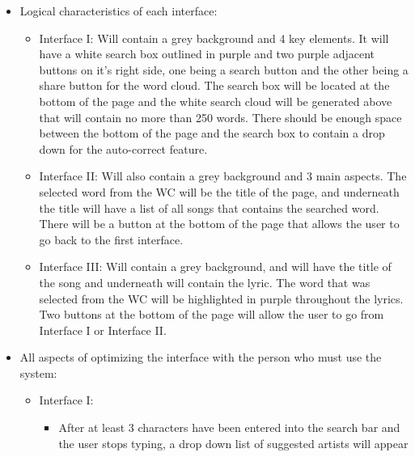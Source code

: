 \documentclass[]{article}
\begin{document}
\begin{itemize}
\itemsep1pt\parskip0pt
\item
  Logical characteristics of each interface:

  \begin{itemize}
  \itemsep1pt\parskip0pt
  \item
    Interface I: Will contain a grey background and 4 key elements. It
    will have a white search box outlined in purple and two purple
    adjacent buttons on it's right side, one being a search button and
    the other being a share button for the word cloud. The search box
    will be located at the bottom of the page and the white search cloud
    will be generated above that will contain no more than 250 words.
    There should be enough space between the bottom of the page and the
    search box to contain a drop down for the auto-correct feature.
  \item
    Interface II: Will also contain a grey background and 3 main
    aspects. The selected word from the WC will be the title of the
    page, and underneath the title will have a list of all songs that
    contains the searched word. There will be a button at the bottom of
    the page that allows the user to go back to the first interface.
  \item
    Interface III: Will contain a grey background, and will have the
    title of the song and underneath will contain the lyric. The word
    that was selected from the WC will be highlighted in purple
    throughout the lyrics. Two buttons at the bottom of the page will
    allow the user to go from Interface I or Interface II.
  \end{itemize}
\item
  All aspects of optimizing the interface with the person who must use
  the system:

  \begin{itemize}
  \itemsep1pt\parskip0pt
  \item
    Interface I:

    \begin{itemize}
    \itemsep1pt\parskip0pt
    \item
      After at least 3 characters have been entered into the search bar
      and the user stops typing, a drop down list of suggested artists
      will appear


\end{itemize}
\end{itemize}
\end{itemize}
\end{document}

